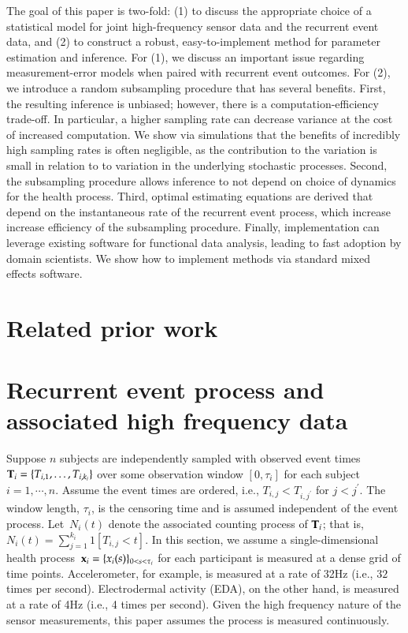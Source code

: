 \documentclass[11pt]{amsart}
\def\bfx{{\bf x}}
\def\bfT{{\bf T}}
\begin{document}
The goal of this paper is two-fold: (1) to discuss the appropriate
choice of a statistical model for joint high-frequency sensor data and
the recurrent event data, and (2) to construct a robust,
easy-to-implement method for parameter estimation and inference. 
For (1), we discuss an important issue regarding measurement-error
models when paired with recurrent event outcomes.
For (2), we introduce a random subsampling procedure that has
several benefits.  First, the resulting inference is unbiased;
however, there is a computation-efficiency trade-off. In particular, a
higher sampling rate can decrease variance at the cost of increased
computation.  We show via simulations that the benefits of incredibly
high sampling rates is often negligible, as the contribution to the
variation is small in relation to to variation in the underlying
stochastic processes. Second, the subsampling procedure allows
inference to not depend on choice of dynamics for the health process.
Third, optimal estimating equations are derived that depend on the
instantaneous rate of the recurrent event process, which increase
increase efficiency of the subsampling procedure. Finally,
implementation can leverage existing software for functional data
analysis, leading to fast adoption by domain scientists. We show how
to implement methods via standard mixed effects software. 

\section{Related prior work}



\section{Recurrent event process and associated high frequency data}

Suppose $n$ subjects are independently sampled with observed event
times~$\bfT_{i} = \{ T_{i,1}, \ldots, T_{i,k_i}\}$ over some observation
window $[0, \tau_i]$ for each subject $i = 1,\cdots, n$.  Assume the
event times are ordered, i.e., $T_{i,j} < T_{i,j^\prime}$ for $j <
j^\prime$. The window length, $\tau_i$, is the censoring time and is
assumed independent of the event process. Let~$N_{i} (t)$ denote the
associated counting process of $\bfT_{i}$; that is, $N_i (t) =
\sum_{j=1}^{k_i} 1 [ T_{i,j} < t ]$.  
In this section, we assume a single-dimensional health process~$\bfx_i
= \{ x_i (s) \}_{0 < s < \tau_i}$ for each participant is measured at
a dense grid of time points.  Accelerometer, for example, is measured
at a rate of 32Hz (i.e., $32$ times per second). Electrodermal
activity (EDA), on the other hand, is measured at a rate of 4Hz (i.e.,
4 times per second).  Given the high frequency nature of the sensor 
measurements, this paper assumes the process is measured continuously.   
\end{document}
